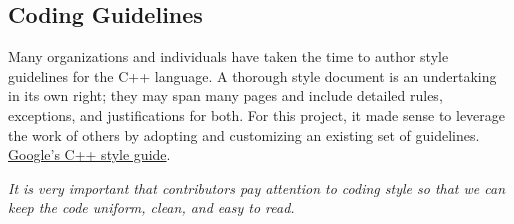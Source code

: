 % 
% 
% 
% 
% 
% 
% 
% 

\subsection{Coding Guidelines}\label{appdx:coding-guidelines}

Many organizations and individuals have taken the time to author style
guidelines for the C++ language. A thorough style document is an undertaking in
its own right; they may span many pages and include detailed rules, exceptions,
and justifications for both. For this project, it made sense to leverage the
work of others by adopting and customizing an existing set of guidelines.
\href{http://google-styleguide.googlecode.com/svn/trunk/cppguide.html}{Google's
C++ style guide}.

\emph{It is very important that contributors pay attention to coding style so
that we can keep the code uniform, clean, and easy to read.}

